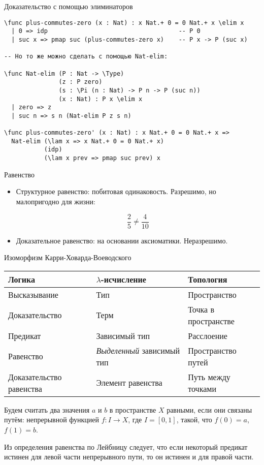 \documentclass[aspectratio=169,dvipsnames,usenames]{beamer}
\begin{document}
\begin{frame}[fragile]{Доказательство с помощью элиминаторов}
\small\color[HTML]{025002}\begin{verbatim}
\func plus-commutes-zero (x : Nat) : x Nat.+ 0 = 0 Nat.+ x \elim x
  | 0 => idp                                    -- P 0
  | suc x => pmap suc (plus-commutes-zero x)    -- P x -> P (suc x)

-- Но то же можно сделать с помощью Nat-elim:

\func Nat-elim (P : Nat -> \Type)
               (z : P zero)
               (s : \Pi (n : Nat) -> P n -> P (suc n))
               (x : Nat) : P x \elim x
  | zero => z
  | suc n => s n (Nat-elim P z s n)

\func plus-commutes-zero' (x : Nat) : x Nat.+ 0 = 0 Nat.+ x =>
  Nat-elim (\lam x => x Nat.+ 0 = 0 Nat.+ x) 
           (idp) 
           (\lam x prev => pmap suc prev) x
\end{verbatim}\normalsize
\color{black}
\end{frame}

\begin{frame}{Равенство}

\begin{itemize}
\item Структурное равенство: побитовая одинаковость.
Разрешимо, но малопригодно для жизни:

$$\frac{2}{5} \ne \frac{4}{10}$$\vspace{0.5cm}

\item Доказательное равенство: на основании аксиоматики. Неразрешимо.
\end{itemize}
\end{frame}

\begin{frame}{Изоморфизм Карри-Ховарда-Воеводского}

\begin{tabular}{lll}
Логика & $\lambda$-исчисление & Топология\\\hline
Высказывание & Тип & Пространство\\
Доказательство & Терм & Точка в пространстве\\
Предикат & Зависимый тип & Расслоение\\
Равенство &\emph{Выделенный} зависимый тип & Пространство путей\\
Доказательство равенства & Элемент равенства & Путь между точками
\end{tabular}

\begin{dfn}Будем считать два значения $a$ и $b$ в пространстве $X$ равными, если они связаны путём: непрерывной функцией $f:I\rightarrow X$,
где $I = [0,1]$, такой, что $f(0)=a$, $f(1)=b$.\end{dfn}
Из определения равенства по Лейбницу следует, что если некоторый предикат истинен для левой части непрерывного пути, то он истинен и для правой части.
\end{frame}
\end{document}
